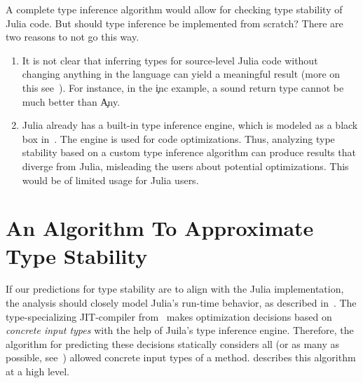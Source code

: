\documentclass[sigplan,screen]{acmart}
\begin{document}
A complete type inference algorithm would allow for checking type stability of
Julia code. But should type inference be implemented from scratch? There are two reasons to
not go this way.
\begin{enumerate}

  \item It is not clear that inferring types for source-level Julia code
  without changing anything in the language
  can yield a meaningful result (more on this see~\cite{Chung23}).
  For instance, in the \c{inc} example, a sound return type cannot be
  much better than \c{Any}.

  \item Julia already has a built-in type inference engine, which
    is modeled as a black box in~\cite{Pelenitsyn21}.
    The engine is used for code optimizations.
    Thus, analyzing type stability based on a custom type inference
    algorithm
    can produce results that diverge from Julia, misleading the users
    about potential optimizations.
    This would be of limited usage for Julia users.
\end{enumerate}

\section{An Algorithm To Approximate Type Stability}%
\label{sec:algo}

If our predictions for type stability are to align with the Julia
implementation, the analysis should closely model Julia's run-time behavior,
as described in~\cite{Pelenitsyn21}. The type-specializing JIT-compiler
from~\cite{Pelenitsyn21} makes optimization decisions based on \emph{concrete
  input types} with the help of Juila's type inference engine.
Therefore, the algorithm for
predicting these decisions statically considers all (or as many as possible,
see~) allowed concrete input types of a method.
 describes this algorithm at a high level.


\end{document}
